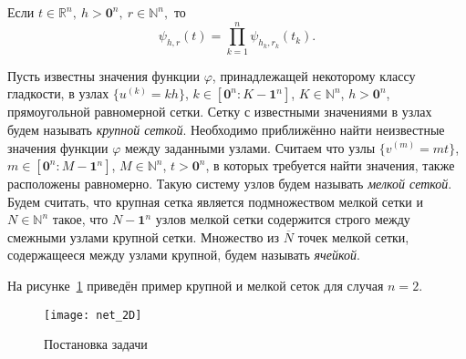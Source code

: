 Если $t\in\mathbb{R}^n,\  h>\mathbf{0}^n,\ r\in\mathbb{N}^n,$ то
\begin{equation*}
  \psi_{h,r}(t)=\prod_{k=1}^n\psi_{h_k,r_k}(t_k).
\end{equation*}


Пусть известны значения  функции $\varphi$, принадлежащей некоторому классу гладкости, 
в  узлах $\{u^{(k)}=kh\}$, $k\in [\mathbf{0}^n : K-\mathbf{1}^n]$, $K\in \mathbb{N}^n$,
$h>\mathbf{0}^n$, прямоугольной
равномерной сетки. 
Сетку с известными значениями в узлах будем называть \textit{крупной сеткой}.
Необходимо приближённо найти неизвестные значения
функции $\varphi$ между заданными узлами.
Считаем что узлы
$ \{v^{(m)}=mt\}$, $m\in [\mathbf{0}^n : M-\mathbf{1}^n]$,
$M\in \mathbb{N}^n$, $t>\mathbf{0}^n$, 
в которых требуется найти значения, 
также расположены
равномерно.
Такую  систему узлов %
будем называть
\textit{мелкой сеткой}.
Будем считать, что крупная сетка является подмножеством мелкой сетки и
$N\in\mathbb{N}^n$ такое, что $N-\mathbf{1}^n$ узлов мелкой сетки содержится строго между
смежными узлами крупной сетки.
Множество из $\overline{N}$ точек мелкой сетки, содержащееся между узлами крупной, будем называть
\textit{ячейкой}.

На рисунке~\ref{fig:net_common} приведён пример крупной и мелкой сеток
для случая $n=2$.
\begin{figure}[h!]
  \centering
  \texttt{[image: net\_2D]}
  \caption{Постановка задачи}
  \label{fig:net_common}
\end{figure}



